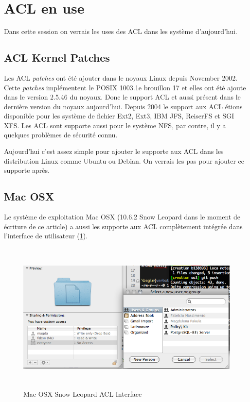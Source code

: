 \section{ACL en use}

Dans cette session on verrais les uses des ACL dans les système d'aujourd'hui. 

\subsection{ACL Kernel Patches}
Les ACL \emph{patches} ont été ajouter dans le noyaux Linux depuis November 2002. Cette \emph{patches} implémentent le POSIX 1003.1e brouillon 17 et elles ont été ajoute dans le version 2.5.46 du noyaux. Donc le support ACL et aussi présent dans le dernière version du noyaux aujourd'hui. Depuis 2004 le support aux ACL étions disponible pour les système de fichier Ext2, Ext3, IBM JFS, ReiserFS et SGI XFS. Les ACL sont supporte aussi pour le système NFS, par contre, il y a quelques problèmes de sécurité connu\cite{nfs_problem}. 

Aujourd'hui c'est assez simple pour ajouter le supporte aux ACL dans les distribution Linux comme Ubuntu ou Debian. On verrais les pas pour ajouter ce supporte après.

\subsection{Mac OSX}
Le système de exploitation Mac OSX (10.6.2 Snow Leopard dans le moment de écriture de ce article) a aussi les supporte aux ACL complètement intégrée dans l'interface de utilisateur (\ref{fig:img_mac-acl}). 

\begin{figure}[htbp]
	\centering
		\includegraphics[height=3in]{img/mac-acl.png}
	\caption{Mac OSX Snow Leopard ACL Interface}
	\label{fig:img_mac-acl}
\end{figure}



